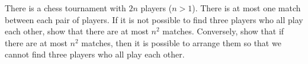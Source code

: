 There is a chess tournament with $2n$ players ($n > 1$). There is at most one match between each pair of players. If it is not possible to find three players who all play each other, show that there are at most $n^2$ matches. Conversely, show that if there are at most $n^2$ matches, then it is possible to arrange them so that we cannot find three players who all play each other.